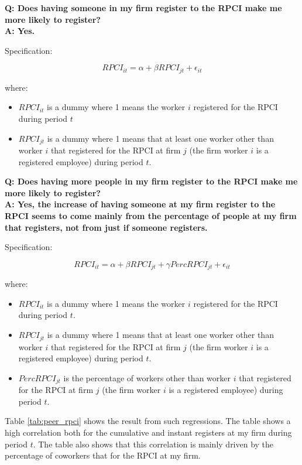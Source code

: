 \documentclass[oneside,11pt]{article}
\begin{document}
\textbf{Q: Does having someone in my firm register to the RPCI make me more likely to register?}
\\
\textbf{A: Yes.}

Specification:

$$RPCI_{it} = \alpha + \beta RPCI_{jt} + \epsilon_{it}$$

where:

\begin{itemize}
    \item $RPCI_{it}$ is a dummy where 1 means the worker $i$ registered for the RPCI during period $t$
    \item $RPCI_{jt}$ is a dummy where 1 means that at least one worker other than worker $i$ that registered for the RPCI at firm $j$ (the firm worker $i$ is a registered employee) during period $t$.
\end{itemize}

\textbf{Q: Does having more people in my firm register to the RPCI make me more likely to register?}
\\
\textbf{A: Yes, the increase of having someone at my firm register to the RPCI seems to come mainly from the percentage of people at my firm that registers, not from just if someone registers.}

Specification:

$$RPCI_{it} = \alpha + \beta RPCI_{jt} + \gamma Perc RPCI_{jt} + \epsilon_{it}$$

where:

\begin{itemize}
    \item $RPCI_{it}$ is a dummy where 1 means the worker $i$ registered for the RPCI during period $t$.
    \item $RPCI_{jt}$ is a dummy where 1 means that at least one worker other than worker $i$ that registered for the RPCI at firm $j$ (the firm worker $i$ is a registered employee) during period $t$.
    \item $PercRPCI_{jt}$ is the percentage of workers other than worker $i$ that registered for the RPCI at firm $j$ (the firm worker $i$ is a registered employee) during period $t$.
\end{itemize}

Table \ref{tab:peer_rpci} shows the result from such regressions. The table shows a high correlation both for the cumulative and instant registers at my firm during period $t$. The table also shows that this correlation is mainly driven by the percentage of coworkers that for the RPCI at my firm.
\end{document}
